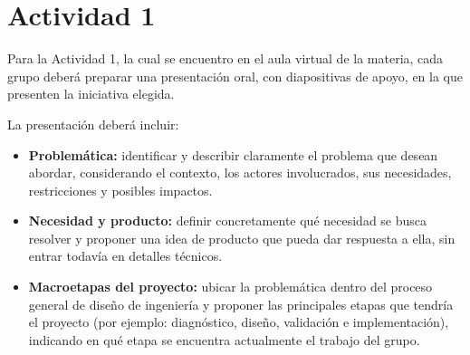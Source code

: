 \section{Actividad 1}
\label{sec:Actividad_1}

Para la Actividad 1, la cual se encuentro en el aula virtual de la materia,  cada grupo deberá preparar una presentación oral, con diapositivas de apoyo, en la que presenten la iniciativa elegida.

La presentación deberá incluir:

\begin{itemize}
    \item \textbf{Problemática:} identificar y describir claramente el problema que desean abordar, considerando el contexto, los actores involucrados, sus necesidades, restricciones y posibles impactos.
    \item \textbf{Necesidad y producto:} definir concretamente qué necesidad se busca resolver y proponer una idea de producto que pueda dar respuesta a ella, sin entrar todavía en detalles técnicos.
    \item \textbf{Macroetapas del proyecto:} ubicar la problemática dentro del proceso general de diseño de ingeniería y proponer las principales etapas que tendría el proyecto (por ejemplo: diagnóstico, diseño, validación e implementación), indicando en qué etapa se encuentra actualmente el trabajo del grupo.
\end{itemize}
